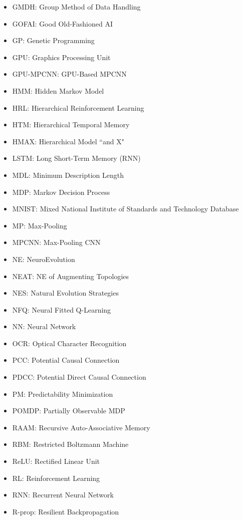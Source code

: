 \documentclass[letterpaper]{article}
\begin{document}
\begin{multicols}{2}
\begin{itemize}[leftmargin=0cm,itemindent=0cm,labelwidth=\itemindent,labelsep=0cm,align=left,noitemsep,nolistsep]
\item[] GMDH: Group Method of Data Handling  
\item[] GOFAI: Good Old-Fashioned AI  
\item[] GP: Genetic Programming 
\item[] GPU: Graphics Processing Unit 
\item[] GPU-MPCNN: GPU-Based MPCNN  
\item[] HMM: Hidden Markov Model 
\item[] HRL: Hierarchical Reinforcement Learning 
\item[] HTM:  Hierarchical Temporal Memory 
\item[] HMAX:  Hierarchical Model ``and X"
\item[] LSTM: Long Short-Term Memory (RNN) 
\item[] MDL: Minimum Description Length 
\item[] MDP:  Markov Decision Process 
\item[] MNIST: Mixed National Institute of Standards and Technology Database 
\item[] MP: Max-Pooling 
\item[] MPCNN: Max-Pooling CNN
\item[] NE: NeuroEvolution 
\item[] NEAT: NE of Augmenting Topologies 
\item[] NES: Natural Evolution Strategies 
\item[] NFQ: Neural Fitted Q-Learning 
\item[] NN: Neural Network 
\item[] OCR: Optical Character Recognition
\item[] PCC: Potential Causal Connection 
\item[] PDCC: Potential Direct Causal Connection 
\item[] PM: Predictability Minimization 
\item[] POMDP:  Partially Observable MDP 
\item[] RAAM: Recursive Auto-Associative Memory  
\item[] RBM: Restricted Boltzmann Machine 
\item[] ReLU: Rectified Linear Unit
\item[] RL: Reinforcement Learning 
\item[] RNN: Recurrent Neural Network 
\item[] R-prop: Resilient Backpropagation 

\end{itemize}
\end{multicols}
\end{document}
